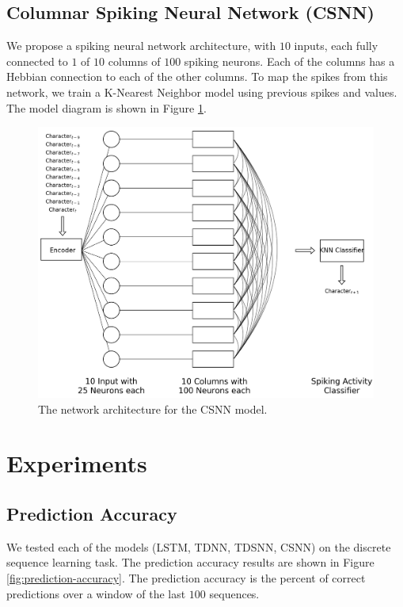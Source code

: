 \documentclass{article}
\begin{document}
\subsection*{Columnar Spiking Neural Network (CSNN)}

We propose a spiking neural network architecture, with $10$ inputs, each fully connected to $1$ of $10$ columns of $100$ spiking neurons. Each of the columns has a Hebbian connection to each of the other columns. To map the spikes from this network, we train a  K-Nearest Neighbor model using previous spikes and values. \cite{beliaev2007time} The model diagram is shown in Figure \ref{fig:csnn-network-diagram}.

\begin{figure}[!h]
    \centering
    \includegraphics[width=0.7\linewidth]{csnn.png}
    \caption{The network architecture for the CSNN model.}
    \label{fig:csnn-network-diagram}
\end{figure}

\section*{Experiments}

\subsection*{Prediction Accuracy}

We tested each of the models (LSTM, TDNN, TDSNN, CSNN) on the discrete sequence learning task. The prediction accuracy results are shown in Figure \ref{fig:prediction-accuracy}. The prediction accuracy is the percent of correct predictions over a window of the last $100$ sequences.
\end{document}
